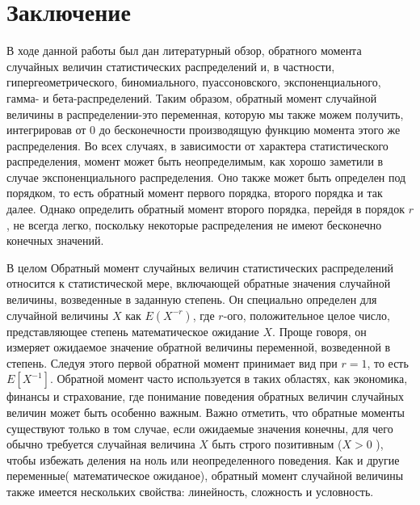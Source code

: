 \documentclass[13pt]{article}
\begin{document}
\newpage
\section{Заключение}\label{section 4}
В ходе данной работы был дан литературный обзор, обратного момента случайных величин статистических распределений и, в частности, гипергеометрического, биномиального, пуассоновского, экспоненциального, гамма- и бета-распределений. Таким образом, обратный момент случайной величины в распределении-это переменная, которую мы также можем получить, интегрировав от 0 до бесконечности производящую функцию момента этого же распределения. Во всех случаях, в зависимости от характера статистического распределения, момент может быть неопределимым, как хорошо заметили в случае экспоненциального распределения. Oно также может быть определен под порядком, то есть обратный момент первого порядка, второго порядка и так далее. Однако определить обратный момент второго порядка, перейдя в порядок $r$, не всегда легко, поскольку некоторые распределения не имеют бесконечно конечных значений.


В целом Обратный момент случайных величин статистических распределений относится к статистической мере, включающей обратные значения случайной величины, возведенные в заданную степень. Он специально определен для случайной величины $X$ как $E(X ^{-r})$, где $r$-ого, положительное целое число, представляющее степень математическое ожидание $X$. Проще говоря, он измеряет ожидаемое значение обратной величины переменной, возведенной в степень. Следуя этого первой обратной момент принимает вид при $r=1$, то есть $E[X^{-1}]$. Обратной момент часто используется в таких областях, как экономика, финансы и страхование, где понимание поведения обратных величин случайных величин может быть особенно важным. Важно отметить, что обратные моменты существуют только в том случае, если ожидаемые значения конечны, для чего обычно требуется случайная величина $X$ быть строго позитивным ($X > 0$ ), чтобы избежать деления на ноль или неопределенного поведения. Как и другие переменные( математическое ожиданое), обратный момент случайной величины также имеется нескольких свойства: линейность, сложность и условность. 
\end{document}

